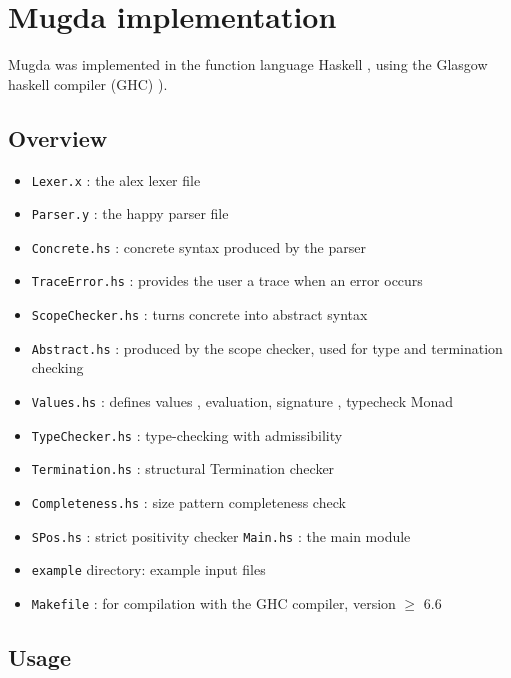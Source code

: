 \appendix
\chapter{Mugda implementation}
Mugda was implemented in the function language Haskell \cite{haskell}, using the Glasgow haskell compiler (GHC) \cite{jones93glasgow}).
\section{Overview}
\begin{itemize}
\item
\texttt{Lexer.x} : the alex lexer file
\item
\texttt{Parser.y} : the happy parser file
\item
\texttt{Concrete.hs} : concrete syntax produced by the parser
\item
\texttt{TraceError.hs} : provides the user a trace when an error occurs
\item
\texttt{ScopeChecker.hs} : turns concrete into abstract syntax
\item
\texttt{Abstract.hs} : produced by the scope checker, used for type and termination checking
\item
\texttt{Values.hs} : defines values , evaluation, signature , typecheck Monad
\item
\texttt{TypeChecker.hs} : type-checking with admissibility
\item
\texttt{Termination.hs} : structural Termination checker
\item
\texttt{Completeness.hs} : size pattern completeness check
\item
\texttt{SPos.hs} : strict positivity checker
\texttt{Main.hs} : the main module
\item
\texttt{example} directory: example input files
\item
\texttt{Makefile} : for compilation with the GHC compiler, version $\geq$ 6.6
\end{itemize}
\section{Usage}

